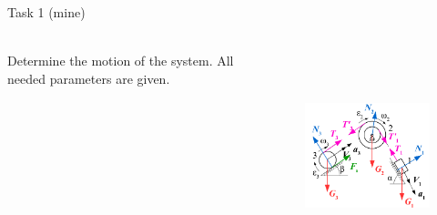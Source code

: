 \documentclass[aspectratio=169]{beamer}
\begin{document}
\begin{frame}[t]{Task 1 (mine)}
\framesubtitle{}
    \begin{columns}[T,onlytextwidth]
        \begin{column}{0.49\textwidth}
            Determine the motion of the system. All needed parameters are given.
        \end{column}
        \begin{column}{0.49\textwidth}
            \vspace{-1cm}
            \begin{figure}[H]
                \centering\includegraphics[height=6cm,width=1\textwidth,keepaspectratio]{im22.png}
                \label{fig:im22.png}
            \end{figure}
        \end{column}
    \end{columns}
\end{frame}
\end{document}
